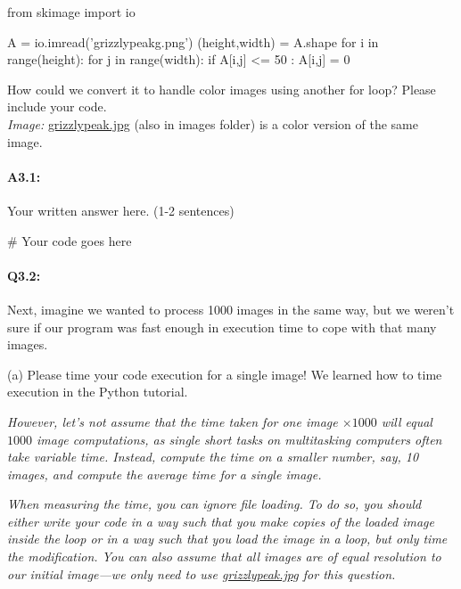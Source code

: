 \documentclass[11pt]{article}
\begin{document}
\begin{python}
from skimage import io

A = io.imread('grizzlypeakg.png')
(height,width) = A.shape
for i in range(height):
    for j in range(width):
        if A[i,j] <= 50 :
            A[i,j] = 0
\end{python}

How could we convert it to handle color images using another for loop? Please include your code. \\

\emph{Image:} \href{images/grizzlypeak.jpg}{grizzlypeak.jpg} (also in images folder) is a color version of the same image.

\paragraph{A3.1:} Your written answer here. (1-2 sentences)
\begin{python}
# Your code goes here
\end{python}



\pagebreak
\paragraph{Q3.2:} Next, imagine we wanted to process 1000 images in the same way, but we weren't sure if our program was fast enough in execution time to cope with that many images. 

(a) Please time your code execution for a single image! We learned how to time execution in the Python tutorial.

\emph{However, let's not assume that the time taken for one image $\times1000$ will equal $1000$ image computations, as single short tasks on multitasking computers often take variable time. Instead, compute the time on a smaller number, say, 10 images, and compute the average time for a single image.}

\emph{When measuring the time, you can ignore file loading. To do so, you should either write your code in a way such that you make copies of the loaded image inside the loop or in a way such that you load the image in a loop, but only time the modification. You can also assume that all images are of equal resolution to our initial image---we only need to use \href{grizzlypeak.jpg}{grizzlypeak.jpg} for this question.}
\end{document}
